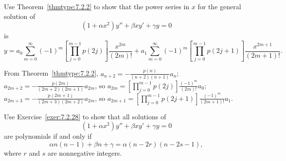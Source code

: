 \documentclass{ximera}
\begin{document}
\begin{problem}\label{exer:7.2.28}
Use Theorem~\ref{thmtype:7.2.2} to show that the power series in
$x$ for the general solution of
$$
(1+\alpha x^2)y''+\beta xy'+\gamma y=0
$$
is
$$
y=a_0\sum^\infty_{m=0}(-1)^m \left[\prod^{m-1}_{j=0}
p(2j)\right] \frac{x^{2m}}{(2m)!} +
a_1\sum^\infty_{m=0}(-1)^m
\left[\prod^{m-1}_{j=0}p(2j+1)\right]
\frac{x^{2m+1}}{(2m+1)!}.
$$

\begin{solution}
    From Theorem~\ref{thmtype:7.2.2},
$a_{n+2}=-\frac{p(n) }{(n+2)(n+1)}a_n$;
$a_{2m+2}=-\frac{p(2m)}{(2m+2)(2m+1)}a_{2m}$, so $a_{2m}=
\left[\prod^{m-1}_{j=0}p(2j)\right] \frac{(-1)^m}{(2m)!}a_0$;
$a_{2m+3}=-\frac{p(2m+1)}{(2m+3)(2m+2)}a_{2m}$, so $a_{2m+1}=
\left[\prod^{m-1}_{j=0}p(2j+1)\right]\frac{(-1)^m}{(2m+1)!}a_1$.
\end{solution}
\end{problem}

\begin{problem}\label{exer:7.2.29}
Use Exercise~\ref{exer:7.2.28}  to
 show that  all  solutions of
$$
(1+\alpha x^2)y''+\beta xy'+\gamma y=0
$$
 are polynomials if and only if
$$
\alpha n(n-1)+\beta n+\gamma=\alpha(n-2r)(n-2s-1),
$$
where $r$ and $s$ are nonnegative integers.
\end{problem}
\end{document}
